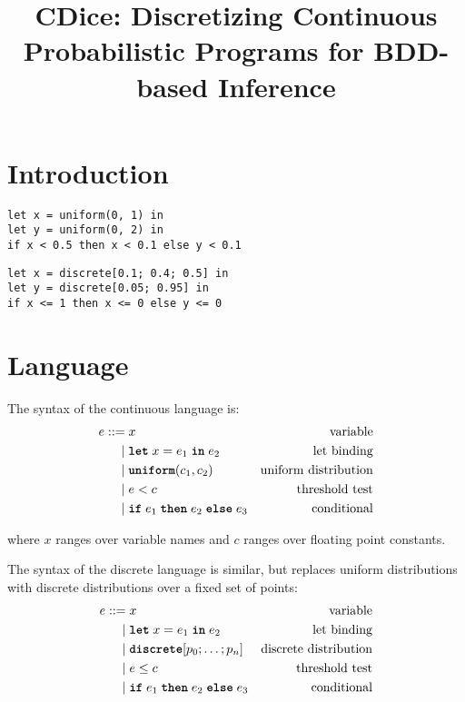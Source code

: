 \documentclass[nonacm,anonymous]{acmart}
\title{CDice: Discretizing Continuous Probabilistic Programs for BDD-based Inference}
\newcommand{\letkw}{\text{\ttfamily\bfseries let}}
\newcommand{\inkw}{\text{\ttfamily\bfseries in}}
\newcommand{\ifkw}{\text{\ttfamily\bfseries if}}
\newcommand{\thenkw}{\text{\ttfamily\bfseries then}}
\newcommand{\elsekw}{\text{\ttfamily\bfseries else}}
\newcommand{\uniform}{\text{\ttfamily\bfseries uniform}}
\newcommand{\discrete}{\text{\ttfamily\bfseries discrete}}
\newcommand{\CDice}{\text{\scshape CDice}\xspace}
\newcommand{\DDice}{\text{\scshape DDice}\xspace}
\begin{document}
\maketitle


\section{Introduction}

\begin{lstlisting}[language=CDice]
let x = uniform(0, 1) in
let y = uniform(0, 2) in
if x < 0.5 then x < 0.1 else y < 0.1
\end{lstlisting}

\begin{lstlisting}[language=CDice]
let x = discrete[0.1; 0.4; 0.5] in
let y = discrete[0.05; 0.95] in
if x <= 1 then x <= 0 else y <= 0
\end{lstlisting}

\section{Language}

The syntax of the continuous language \CDice is:
%
\begin{align*}
e ::= &\; x                               & \text{variable} \\
    | &\; \letkw \; x = e_1\; \inkw \; e_2  & \text{let binding} \\
    | &\; \uniform(c_1, c_2)      & \text{uniform distribution} \\
    | &\; e < c                           & \text{threshold test} \\
    | &\; \ifkw \; e_1\; \thenkw \; e_2\; \elsekw \; e_3 & \text{conditional}
\end{align*}

\noindent where $x$ ranges over variable names and $c$ ranges over floating point constants.

The syntax of the discrete language \DDice is similar, but replaces uniform distributions with discrete distributions over a fixed set of points:
%
\begin{align*}
e ::= &\; x                               & \text{variable} \\
    | &\; \letkw \; x = e_1\; \inkw \; e_2  & \text{let binding} \\
    | &\; \discrete[p_0; \ldots; p_{n}]      & \text{discrete distribution} \\
    | &\; e \leq c                           & \text{threshold test} \\
    | &\; \ifkw \; e_1\; \thenkw \; e_2\; \elsekw \; e_3 & \text{conditional}
\end{align*}
\end{document}
